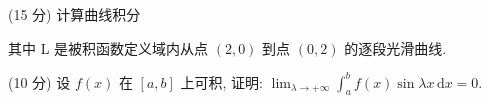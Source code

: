 \par{}
(15 分) 计算曲线积分\par
\nopagebreak[4]
其中 L 是被积函数定义域内从点  $(2,0)$  到点  $(0,2)$  的逐段光滑曲线.\par
\par{}
(10 分) 设 $f(x)$ 在 $[a, b]$ 上可积, 证明: $\lim_{\lambda \to +\infty} \int_{a}^{b} f(x) \sin \lambda x \, \mathrm{d}x = 0$.\par
